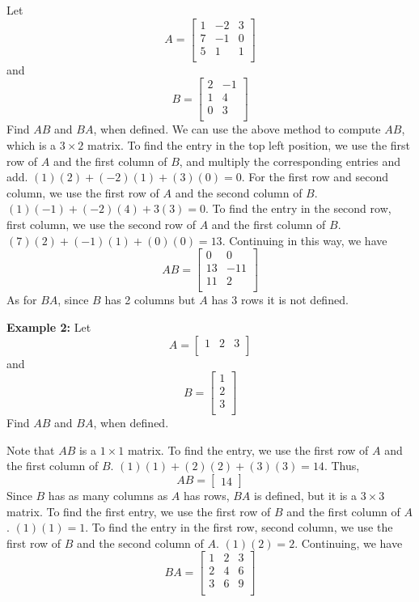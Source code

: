 \documentclass{article}
\begin{document}
\begin{examples}
  Let
  \[A =
    \begin{bmatrix}
      1 & -2 & 3\\
      7 & -1 & 0\\
      5 & 1 & 1\\
  \end{bmatrix}\]
  and \[
    B=
    \begin{bmatrix}
      2 & -1\\
      1 & 4\\
      0 & 3\\
    \end{bmatrix}
  \]
  Find $AB$ and $BA$, when defined.
  We can use the above method to compute $AB$, which is a $3 \times 2$ matrix. To find the entry in the top left position, we use the first row of $A$ and the first column of $B$, and multiply the corresponding entries and add. $(1)(2) + (-2)(1) + (3)(0) = 0$. For the first row and second column, we use the first row of $A$ and the second column of $B$. $(1)(-1) + (-2)(4) + 3(3) = 0$. To find the entry in the second row, first column, we use the second row of $A$ and the first column of $B$. $(7)(2) + (-1)(1) + (0)(0) = 13$. Continuing in this way, we have
  \[AB =
    \begin{bmatrix}
      0 & 0\\
      13 & -11\\
      11 & 2\\
  \end{bmatrix}\]
  As for $BA$, since $B$ has 2 columns but $A$ has 3 rows it is not defined.

  \textbf{Example 2:}\newline
  Let
  \[A =
    \begin{bmatrix}
      1 & 2 & 3\\
  \end{bmatrix}\]
  and \[B =
    \begin{bmatrix}
      1\\
      2\\
      3\\
    \end{bmatrix}
  \]
  Find $AB$ and $BA$, when defined.

  Note that $AB$ is a $1 \times 1$ matrix. To find the entry, we use the first row of $A$ and the first column of $B$. $(1)(1) + (2)(2) + (3)(3) = 14$. Thus, \[
    AB =
    \begin{bmatrix}
      14
  \end{bmatrix}\]
  Since $B$ has as many columns as $A$ has rows, $BA$ is defined, but it is a $3 \times 3$ matrix. To find the first entry, we use the first row of $B$ and the first column of $A$. $(1)(1) = 1$. To find the entry in the first row, second column, we use the first row of $B$ and the second column of $A$. $(1)(2) = 2$. Continuing, we have \[
    BA =
    \begin{bmatrix}
      1 & 2 & 3\\
      2 & 4 & 6\\
      3 & 6 & 9\\
    \end{bmatrix}
  \]
\end{examples}
\end{document}
